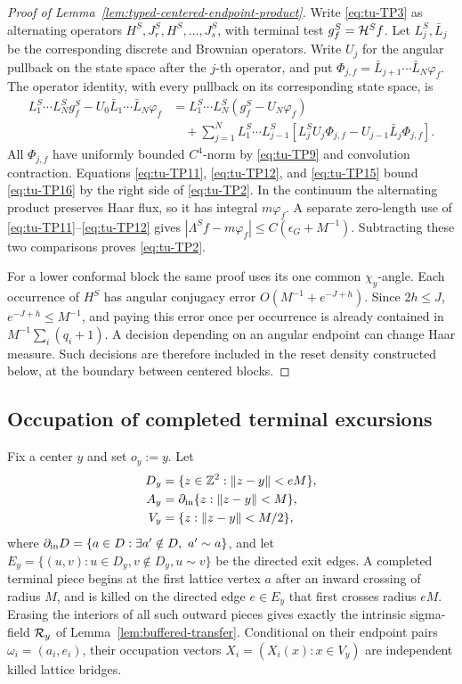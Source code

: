 \begin{proof}[Proof of Lemma~\ref{lem:typed-centered-endpoint-product}]
Write \eqref{eq:tu-TP3} as alternating operators
\(H^S,J_r^S,H^S,\ldots,J_s^S\), with terminal test
\(g_f^S={\cal H}^Sf\).  Let \(L_j^S,\bar L_j\) be the corresponding
discrete and Brownian operators. Write \(U_j\) for the angular pullback
on the state space after the \(j\)-th operator, and put
\(\Phi_{j,f}=\bar L_{j+1}\cdots\bar L_N\varphi_f\).  The operator identity, with every pullback on its corresponding state
space, is
\begin{equation}
\begin{split}
 L_1^S\cdots L_N^Sg_f^S-U_0\bar L_1\cdots\bar L_N\varphi_f
 &=L_1^S\cdots L_N^S(g_f^S-U_N\varphi_f)\\
 &\quad+\sum_{j=1}^NL_1^S\cdots L_{j-1}^S
 [L_j^SU_j\Phi_{j,f}-U_{j-1}\bar L_j\Phi_{j,f}].          \end{split}
\tag{TP16}\label{eq:tu-TP16}
\end{equation}
All \(\Phi_{j,f}\) have uniformly bounded \(C^4\)-norm by \eqref{eq:tu-TP9} and
convolution contraction.  Equations \eqref{eq:tu-TP11}, \eqref{eq:tu-TP12}, and \eqref{eq:tu-TP15} bound
\eqref{eq:tu-TP16} by the right side of \eqref{eq:tu-TP2}.  In the continuum the alternating
product preserves Haar flux, so it has integral \(m\varphi_f\).  A
separate zero-length use of \eqref{eq:tu-TP11}--\eqref{eq:tu-TP12} gives
\(|\Lambda^Sf-m\varphi_f|\le C(\epsilon_G+M^{-1})\).
Subtracting these two comparisons proves \eqref{eq:tu-TP2}.

For a lower conformal block the same proof uses its one common
\(\chi_y\)-angle.  Each occurrence of \(H^S\) has angular conjugacy error
\(O(M^{-1}+e^{-J+h})\).  Since \(2h\le J\),
\(e^{-J+h}\le M^{-1}\), and paying this error once per occurrence is
already contained in \(M^{-1}\sum_i(q_i+1)\). A decision depending on
an angular endpoint can change Haar measure. Such decisions are therefore
included in the reset density constructed below, at the boundary between
centered blocks.
\end{proof}

\subsection{Occupation of completed terminal excursions}
Fix a center \(y\) and set \(o_y:=y\).  Let
\[
\begin{aligned}
 D_y&=\{z\in\mathbb Z^2:\|z-y\|<eM\},\\
 A_y&=\partial_{\rm in}\{z:\|z-y\|<M\},\\
 V_y&=\{z:\|z-y\|<M/2\},
\end{aligned}
\]
where \(\partial_{\rm in}D=\{a\in D:\exists a'\notin D,\ a'\sim a\}\),
and let \(E_y=\{(u,v):u\in D_y,v\notin D_y,u\sim v\}\) be the directed
exit edges.  A completed
terminal piece begins at the first lattice vertex \(a\) after an inward
crossing of radius \(M\), and is killed on the directed edge \(e\in E_y\)
that first crosses radius \(eM\).  Erasing the interiors of all such
outward pieces gives exactly the intrinsic sigma-field \({\cal R}_y\) of
Lemma~\ref{lem:buffered-transfer}.  Conditional on their endpoint pairs
\(\omega_i=(a_i,e_i)\), their occupation vectors
\(X_i=(X_i(x):x\in V_y)\) are independent killed lattice bridges.

